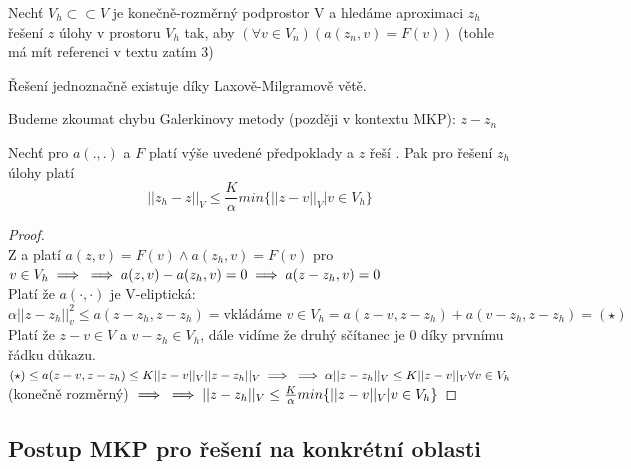 \documentclass[../main.tex]{subfiles}
\begin{document}
Nechť $V_h \subset \subset V$ je konečně-rozměrný podprostor V a hledáme aproximaci $z_h$ řešení $z$ úlohy  v prostoru $V_h$ tak, aby $(\forall v\in V_n)(a(z_n,v) = F(v))$ (tohle má mít referenci v textu zatím 3)


\begin{remark}
    Řešení  jednoznačně existuje díky Laxově-Milgramově větě.
\end{remark}

\begin{remark}
    Budeme zkoumat chybu Galerkinovy metody (později v kontextu MKP): $z-z_n$
\end{remark}

\begin{theorem}[Céova]
    

Nechť pro $a(.,.)$ a $F$ platí výše uvedené předpoklady a $z$ řeší  . Pak pro řešení $z_h$ úlohy  platí 
\begin{equation}
    ||z_h - z||_V \leq \frac{K}{\alpha} min\{||z - v||_V | v\in V_h \}
\end{equation} 
\end{theorem}

\begin{proof}
    \ \\
    Z  a  platí $a(z,v) = F(v) \wedge a(z_h, v) = F(v)$ pro $ v\in V_h  \implies \\ \implies a(z,v) - a(z_h,v)=0 \implies a(z - z_h, v)= 0$
    \\
    Platí že $a(\cdot,\cdot)$ je V-eliptická:\\ $\alpha ||z - z_h||^2_v \leq a(z-z_h, z-z_h) = \text{vkládáme } v \in V_h = a(z-v, z-z_h) + a(v-z_h, z-z_h) = (\star)$
    \\
    Platí že $z-v \in V$ a $v - z_h \in V_h$, dále vidíme že druhý sčítanec je 0 díky prvnímu řádku důkazu. 
    \\
    $(\star) \leq a(z-v, z-z_h) \leq K ||z-v||_V ||z-z_h||_V \implies \\ \implies \alpha||z-z_h||_V \leq K ||z-v||_V \forall v\in V_h$ (konečně rozměrný)
$\implies \\ \implies ||z-z_h||_V  \leq \frac{K}{\alpha} min\{||z-v||_V |v\in V_h  \}$
\end{proof}


\subsection{Postup MKP pro řešení  na konkrétní oblasti}
\end{document}
